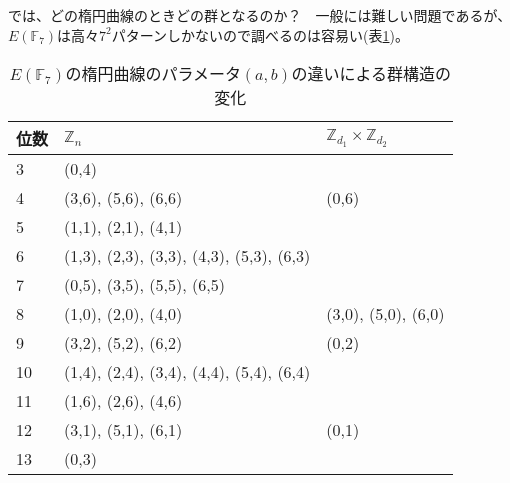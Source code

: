 では、どの楕円曲線のときどの群となるのか？　一般には難しい問題であるが、$E(\mathbb{F}_7)$は高々$7^2$パターンしかないので調べるのは容易い(表\ref{table:EFF_7})。

\begin{table}[htb]\label{table:EFF_7}
\begin{center}
\caption{$E(\mathbb{F}_7)$の楕円曲線のパラメータ$(a,b)$の違いによる群構造の変化}
\begin{tabular}{|l|l|l|}\hline
位数 & $\mathbb{Z}_n$                         & $\mathbb{Z}_{d_1}\times\mathbb{Z}_{d_2}$ \\\hline\hline
3  & (0,4)                                    &                                          \\\hline
4  & (3,6), (5,6), (6,6)                      & (0,6)                                    \\\hline
5  & (1,1), (2,1), (4,1)                      &                                          \\\hline
6  & (1,3), (2,3), (3,3), (4,3), (5,3), (6,3) &                                          \\\hline
7  & (0,5), (3,5), (5,5), (6,5)               &                                          \\\hline
8  & (1,0), (2,0), (4,0)                      & (3,0), (5,0), (6,0)                      \\\hline
9  & (3,2), (5,2), (6,2)                      & (0,2)                                    \\\hline
10 & (1,4), (2,4), (3,4), (4,4), (5,4), (6,4) &                                          \\\hline
11 & (1,6), (2,6), (4,6)                      &                                          \\\hline
12 & (3,1), (5,1), (6,1)                      & (0,1)                                    \\\hline
13 & (0,3)                                    &                                          \\\hline
\end{tabular}
\end{center}
\end{table}

